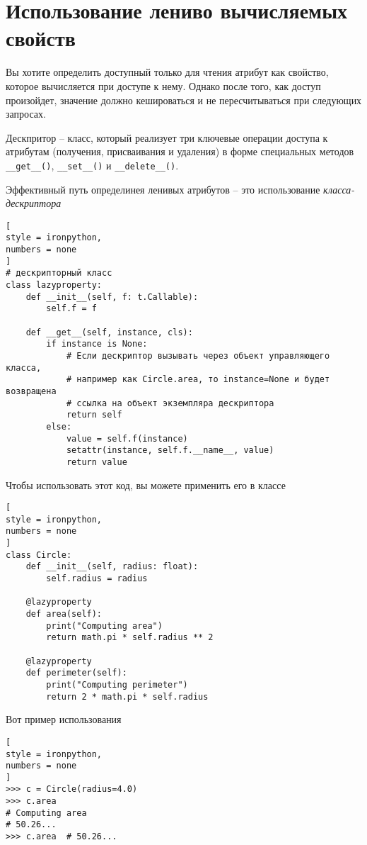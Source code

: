 \documentclass[%
	11pt,
	a4paper,
	utf8,
		]{article}
\begin{document}
\section{Использование лениво вычисляемых свойств}

Вы хотите определить доступный только для чтения атрибут как свойство, которое вычисляется при доступе к нему. Однако после того, как доступ произойдет, значение должно кешироваться и не пересчитываться при следующих запросах.

Дескпритор -- класс, который реализует три ключевые операции доступа к атрибутам (получения, присваивания и удаления) в форме специальных методов \verb|__get__()|, \verb|__set__()| и \verb|__delete__()|.

Эффективный путь определинея ленивых атрибутов -- это использование \emph{класса-дескриптора} \cite[]{beazley:python_cookbook-2019}
\begin{lstlisting}[
style = ironpython,
numbers = none
]
# дескрипторный класс
class lazyproperty:
    def __init__(self, f: t.Callable):
        self.f = f
        
    def __get__(self, instance, cls):
        if instance is None:
            # Если дескриптор вызывать через объект управляющего класса,
            # например как Circle.area, то instance=None и будет возвращена
            # ссылка на объект экземпляра дескриптора
            return self  
        else:
            value = self.f(instance)
            setattr(instance, self.f.__name__, value)
            return value
\end{lstlisting}

Чтобы использовать этот код, вы можете применить его в классе
\begin{lstlisting}[
style = ironpython,
numbers = none
]
class Circle:
    def __init__(self, radius: float):
        self.radius = radius
        
    @lazyproperty
    def area(self):
        print("Computing area")
        return math.pi * self.radius ** 2
    
    @lazyproperty
    def perimeter(self):
        print("Computing perimeter")
        return 2 * math.pi * self.radius
\end{lstlisting}

Вот пример использования
\begin{lstlisting}[
style = ironpython,
numbers = none
]
>>> c = Circle(radius=4.0)
>>> c.area
# Computing area
# 50.26...
>>> c.area  # 50.26...
\end{lstlisting}
\end{document}
